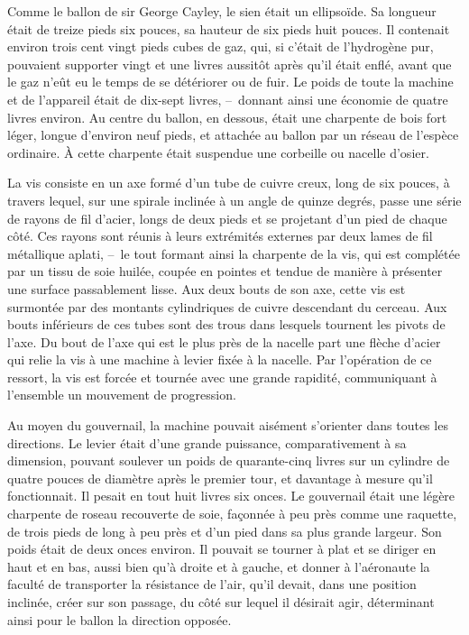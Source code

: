 \documentclass[french,twoside]{book} %
\begin{document}
Comme le ballon de sir George Cayley, le sien était un ellipsoïde. Sa longueur était de treize pieds six pouces, sa hauteur de six pieds huit pouces. Il contenait environ trois cent vingt pieds cubes de gaz, qui, si c’était de l’hydrogène pur, pouvaient supporter vingt et une livres aussitôt après qu’il était enflé, avant que le gaz n’eût eu le temps de se détériorer ou de fuir. Le poids de toute la machine et de l’appareil était de dix-sept livres, – donnant ainsi une économie de quatre livres environ. Au centre du ballon, en dessous, était une charpente de bois fort léger, longue d’environ neuf pieds, et attachée au ballon par un réseau de l’espèce ordinaire. À cette charpente était suspendue une corbeille ou nacelle d’osier.\par
La vis consiste en un axe formé d’un tube de cuivre creux, long de six pouces, à travers lequel, sur une spirale inclinée à un angle de quinze degrés, passe une série de rayons de fil d’acier, longs de deux pieds et se projetant d’un pied de chaque côté. Ces rayons sont réunis à leurs extrémités externes par deux lames de fil métallique aplati, – le tout formant ainsi la charpente de la vis, qui est complétée par un tissu de soie huilée, coupée en pointes et tendue de manière à présenter une surface passablement lisse. Aux deux bouts de son axe, cette vis est surmontée par des montants cylindriques de cuivre descendant du cerceau. Aux bouts inférieurs de ces tubes sont des trous dans lesquels tournent les pivots de l’axe. Du bout de l’axe qui est le plus près de la nacelle part une flèche d’acier qui relie la vis à une machine à levier fixée à la nacelle. Par l’opération de ce ressort, la vis est forcée et tournée avec une grande rapidité, communiquant à l’ensemble un mouvement de progression.\par
Au moyen du gouvernail, la machine pouvait aisément s’orienter dans toutes les directions. Le levier était d’une grande puissance, comparativement à sa dimension, pouvant soulever un poids de quarante-cinq livres sur un cylindre de quatre pouces de diamètre après le premier tour, et davantage à mesure qu’il fonctionnait. Il pesait en tout huit livres six onces. Le gouvernail était une légère charpente de roseau recouverte de soie, façonnée à peu près comme une raquette, de trois pieds de long à peu près et d’un pied dans sa plus grande largeur. Son poids était de deux onces environ. Il pouvait se tourner à plat et se diriger en haut et en bas, aussi bien qu’à droite et à gauche, et donner à l’aéronaute la faculté de transporter la résistance de l’air, qu’il devait, dans une position inclinée, créer sur son passage, du côté sur lequel il désirait agir, déterminant ainsi pour le ballon la direction opposée.\par
\end{document}
